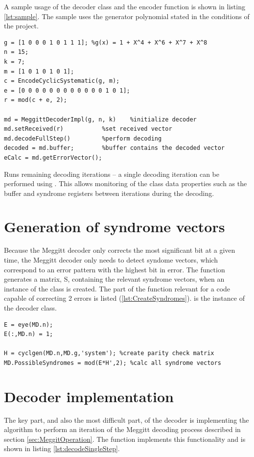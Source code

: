 \documentclass[Main]{subfiles}
\begin{document}
A sample usage of the decoder class and the encoder function is shown in listing \ref{lst:sample}. The sample uses the generator polynomial stated in the conditions of the project.

\begin{lstlisting}[label={lst:sample},captionpos=b, caption=Sample usage of the decoder.] 
%setup
g = [1 0 0 0 1 0 1 1 1]; %g(x) = 1 + X^4 + X^6 + X^7 + X^8
n = 15;
k = 7;
m = [1 0 1 0 1 0 1];
c = EncodeCyclicSystematic(g, m);
e = [0 0 0 0 0 0 0 0 0 0 0 0 1 0 1];
r = mod(c + e, 2);

md = MeggittDecoderImpl(g, n, k)	%initialize decoder
md.setReceived(r)			%set received vector
md.decodeFullStep()			%perform decoding
decoded = md.buffer;		%buffer contains the decoded vector
eCalc = md.getErrorVector();
\end{lstlisting}

 Runs remaining decoding iterations -- a single decoding iteration can be performed using . This allows monitoring of the class data properties such as the buffer and syndrome registers between iterations during the decoding.

\section{Generation of syndrome vectors}
Because the Meggitt decoder only corrects the most significant bit at a given time, the Meggitt decoder only needs to detect syndome vectors, which correspond to an error pattern with the highest bit in error. The function  generates a matrix, S, containing the relevant syndrome vectors, when an instance of the  class is created. The part of the function relevant for a code capable of correcting 2 errors is listed (\ref{lst:CreateSyndromes}).  is the instance of the decoder class.

\begin{lstlisting}[label={lst:CreateSyndromes},captionpos=b, caption=Creating possible syndrome vectors.] 
%create 2 bit error patterns with highest bit in error
E = eye(MD.n);
E(:,MD.n) = 1;

H = cyclgen(MD.n,MD.g,'system'); %create parity check matrix
MD.PossibleSyndromes = mod(E*H',2); %calc all syndrome vectors
\end{lstlisting}

\section{Decoder implementation}
The key part, and also the most difficult part, of the decoder is implementing the algorithm to perform an iteration of the Meggitt decoding process described in section \ref{sec:MeggitOperation}. The function  implements this functionality and is shown in listing \ref{lst:decodeSingleStep}.
\end{document}
